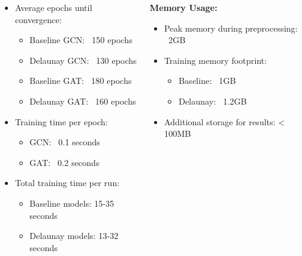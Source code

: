\documentclass[10pt, aspectratio = 169]{beamer}
\begin{document}
\begin{frame}
\begin{columns}[t]
\begin{column}{0.33\textwidth}
\begin{itemize}
                \item Average epochs until convergence:
                \begin{itemize}
                    \scriptsize
                    \item Baseline GCN: ~150 epochs
                    \item Delaunay GCN: ~130 epochs
                    \item Baseline GAT: ~180 epochs
                    \item Delaunay GAT: ~160 epochs
                \end{itemize}
                \item Training time per epoch:
                \begin{itemize}
                    \scriptsize
                    \item GCN: ~0.1 seconds
                    \item GAT: ~0.2 seconds
                \end{itemize}
                \item Total training time per run:
                \begin{itemize}
                    \scriptsize
                    \item Baseline models: 15-35 seconds
                    \item Delaunay models: 13-32 seconds
                \end{itemize}
            \end{itemize}
        \end{column}
        \begin{column}{0.33\textwidth}
            \textbf{Memory Usage:}
            \begin{itemize}
                \small
                \item Peak memory during preprocessing: ~2GB
                \item Training memory footprint:
                \begin{itemize}
                    \scriptsize
                    \item Baseline: ~1GB
                    \item Delaunay: ~1.2GB
                \end{itemize}
                \item Additional storage for results: < 100MB
            \end{itemize}
        \end{column}
        
    \end{columns}
\end{frame}
\end{document}
